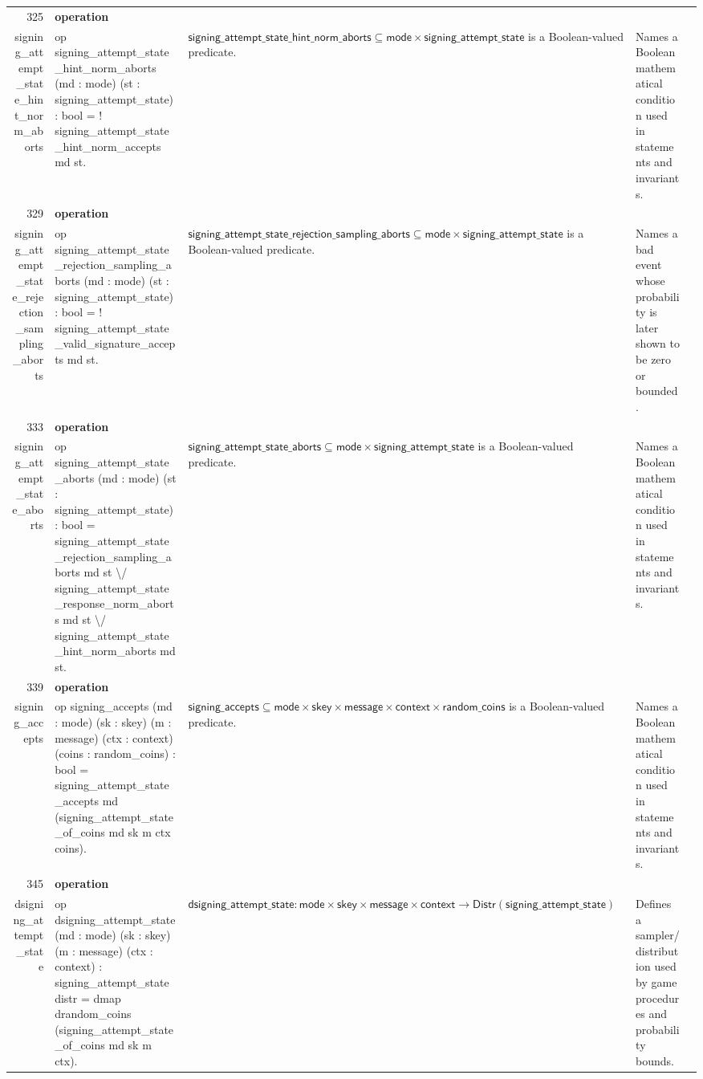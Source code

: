 \documentclass[10pt]{article}
\newcommand{\ec}[1]{\begingroup\ttfamily\scriptsize #1\endgroup}
\begin{document}
\begin{longtable}{r L{0.17\textwidth} L{0.26\textwidth} L{0.27\textwidth} L{0.20\textwidth}}
325 & \textbf{operation}\\\ec{signing\_attempt\_state\_hint\_norm\_aborts} & \ec{op signing\_attempt\_state\_hint\_norm\_aborts (md : mode) (st : signing\_attempt\_state) : bool = ! signing\_attempt\_state\_hint\_norm\_accepts md st.} & \(\mathsf{signing\_attempt\_state\_hint\_norm\_aborts} \subseteq \mathsf{mode} \times \mathsf{signing\_attempt\_state}\) is a Boolean-valued predicate. & Names a Boolean mathematical condition used in statements and invariants. \\
329 & \textbf{operation}\\\ec{signing\_attempt\_state\_rejection\_sampling\_aborts} & \ec{op signing\_attempt\_state\_rejection\_sampling\_aborts (md : mode) (st : signing\_attempt\_state) : bool = ! signing\_attempt\_state\_valid\_signature\_accepts md st.} & \(\mathsf{signing\_attempt\_state\_rejection\_sampling\_aborts} \subseteq \mathsf{mode} \times \mathsf{signing\_attempt\_state}\) is a Boolean-valued predicate. & Names a bad event whose probability is later shown to be zero or bounded. \\
333 & \textbf{operation}\\\ec{signing\_attempt\_state\_aborts} & \ec{op signing\_attempt\_state\_aborts (md : mode) (st : signing\_attempt\_state) : bool = signing\_attempt\_state\_rejection\_sampling\_aborts md st \textbackslash{}/ signing\_attempt\_state\_response\_norm\_aborts md st \textbackslash{}/ signing\_attempt\_state\_hint\_norm\_aborts md st.} & \(\mathsf{signing\_attempt\_state\_aborts} \subseteq \mathsf{mode} \times \mathsf{signing\_attempt\_state}\) is a Boolean-valued predicate. & Names a Boolean mathematical condition used in statements and invariants. \\
339 & \textbf{operation}\\\ec{signing\_accepts} & \ec{op signing\_accepts (md : mode) (sk : skey) (m : message) (ctx : context) (coins : random\_coins) : bool = signing\_attempt\_state\_accepts md (signing\_attempt\_state\_of\_coins md sk m ctx coins).} & \(\mathsf{signing\_accepts} \subseteq \mathsf{mode} \times \mathsf{skey} \times \mathsf{message} \times \mathsf{context} \times \mathsf{random\_coins}\) is a Boolean-valued predicate. & Names a Boolean mathematical condition used in statements and invariants. \\
345 & \textbf{operation}\\\ec{dsigning\_attempt\_state} & \ec{op dsigning\_attempt\_state (md : mode) (sk : skey) (m : message) (ctx : context) : signing\_attempt\_state distr = dmap drandom\_coins (signing\_attempt\_state\_of\_coins md sk m ctx).} & \(\mathsf{dsigning\_attempt\_state} : \mathsf{mode} \times \mathsf{skey} \times \mathsf{message} \times \mathsf{context} \to \mathsf{Distr}(\mathsf{signing\_attempt\_state})\) & Defines a sampler/distribution used by game procedures and probability bounds. \\

\end{longtable}
\end{document}
